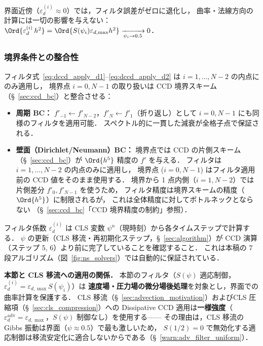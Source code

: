 界面近傍（$\varepsilon_d^{(i)} \approx 0$）では，フィルタ誤差がゼロに退化し，
曲率・法線方向の計算には一切の影響を与えない：
$\Ord{\varepsilon_d^{(i)}\,h^2} = \Ord{S(\psi_i)\varepsilon_{d,\max}h^2} \xrightarrow[\psi_i \to 0.5]{} 0$．

\subsubsection{境界条件との整合性}
\label{sec:dccd_bc}

フィルタ式~\eqref{eq:dccd_apply_d1}--\eqref{eq:dccd_apply_d2} は $i = 1, \ldots, N-2$ の内点にのみ適用し，
境界点 $i = 0, N-1$ の取り扱いは CCD 境界スキーム（§~\ref{sec:ccd_bc}）と整合させる：

\begin{itemize}
  \item \textbf{周期 BC：}
        $f'_{-1} \leftarrow f'_{N-2}$，$f'_{N} \leftarrow f'_{1}$（折り返し）として
        $i=0, N-1$ にも同様のフィルタを適用可能．
        スペクトル的に一貫した減衰が全格子点で保証される．
  \item \textbf{壁面（Dirichlet/Neumann）BC：}
        境界点では CCD の片側スキーム（§~\ref{sec:ccd_bc}）が $\Ord{h^5}$ 精度の $f'$ を与える．
        フィルタは $i=1, \ldots, N-2$ の内点のみに適用し，
        境界点 ($i=0, N-1$) はフィルタ適用前の CCD 値をそのまま使用する．
        境界から 1 点内側（$i=1, N-2$）では片側差分 $f'_0, f'_{N-1}$ を使うため，
        フィルタ精度は境界スキームの精度（$\Ord{h^5}$）に制限されるが，
        これは全体精度に対してボトルネックとならない
        （§~\ref{sec:ccd_bc}「CCD 境界精度の制約」参照）．
\end{itemize}

\begin{tcolorbox}[warnbox, title={Dissipative-CCD フィルタの適用範囲（実装上の注意）}]
フィルタ係数 $\varepsilon_d^{(i)}$ は CLS 変数 $\psi^n$（現時刻）から各タイムステップで計算する．
$\psi$ の更新（CLS 移流・再初期化ステップ，§~\ref{sec:algorithm}）が
CCD 演算（ステップ 5, 6）より前に完了していることを確認すること．
これは本稿の 7 段アルゴリズム（図~\ref{fig:ns_solvers}）では自動的に保証されている．
\end{tcolorbox}

\noindent\textbf{本節と CLS 移流への適用の関係．}
本節のフィルタ（$S(\psi)$ 適応制御，$\varepsilon_d^{(i)} = \varepsilon_{d,\max}S(\psi_i)$）は
\textbf{速度場・圧力場の微分場後処理}を対象とし，界面での曲率計算を保護する．
CLS 移流（§~\ref{sec:advection_motivation}）およびCLS 圧縮項（§~\ref{sec:cls_compression}）への
Dissipative CCD 適用は\textbf{一様強度}（$\varepsilon_d^{\mathrm{adv}} = \varepsilon_{d,\max}$，$S(\psi)$ 制御なし）を使用する——
その理由は，CLS 移流の Gibbs 振動は界面（$\psi \approx 0.5$）で最も激しいため，
$S(1/2) = 0$ で無効化する適応制御は移流安定化に適合しないからである（§~\ref{warn:adv_filter_uniform}）．

